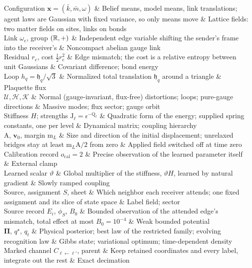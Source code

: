 \begin{decoder}
Configuration \(\mathbf x=(\bar k,\bar m,\omega)\) & Belief means, model means, link translations; agent laws are Gaussian with fixed variance, so only means move & Lattice fields: two matter fields on sites, links on bonds \\
Link \(\omega_e\), group \((\mathbb R,+)\) & Independent edge variable shifting the sender's frame into the receiver's & Noncompact abelian gauge link \\
Residual \(r_e\), cost \(\tfrac12r_e^2\) & Edge mismatch; the cost is a relative entropy between unit Gaussians & Covariant difference; bond energy \\
Loop \(h_q=\mathfrak h_q/\sqrt3\) & Normalized total translation \(\mathfrak h_q\) around a triangle & Plaquette flux \\
\(\mathcal U,\mathcal H,\mathcal K\) & Normal (gauge-invariant, flux-free) distortions; loops; pure-gauge directions & Massive modes; flux sector; gauge orbit \\
Stiffness \(H\); strengths \(\mathrm J_\ell=\epsilon^{-\mathrm Q_\ell}\) & Quadratic form of the energy; supplied spring constants, one per level & Dynamical matrix; coupling hierarchy \\
\(\mathrm A\), \(\mathbf v_0\), margin \(\mathrm m_L\) & Size and direction of the initial displacement; unrelaxed bridges stay at least \(\mathrm m_L\mathrm A/2\) from zero & Applied field switched off at time zero \\
Calibration record \(o_{\mathrm{cal}}=2\) & Precise observation of the learned parameter itself & External clamp \\
Learned scalar \(\vartheta\) & Global multiplier of the stiffness, \(\vartheta H\), learned by natural gradient & Slowly ramped coupling \\
Source, assignment \(S\), sheet & Which neighbor each receiver attends; one fixed assignment and its slice of state space & Label field; sector \\
Source record \(E_i\), \(\phi_S\), \(B_0\) & Bounded observation of the attended edge's mismatch, total effect at most \(B_0=10^{-4}\) & Weak bounded potential \\
\(\boldsymbol\Pi\), \(q^\star\), \(q_t\) & Physical posterior; best law of the restricted family; evolving recognition law & Gibbs state; variational optimum; time-dependent density \\
Marked channel \(C_{\ell\leftarrow\ell'}\), parent & Keep retained coordinates and every label, integrate out the rest & Exact decimation \\

\end{decoder}
